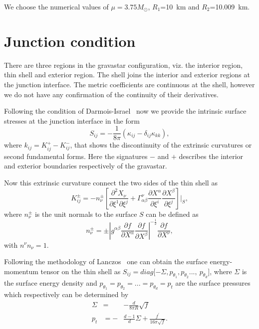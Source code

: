 \documentclass[preprint,12pt]{elsarticle}
\begin{document}
We choose the numerical values of $\mu=3.75M_\odot$, $R_1$=10~km and $R_2$=10.009~km.



\section{Junction condition}
There are three regions in the gravastar configuration, viz.
the interior region, thin shell and exterior region. The shell joins the
interior and exterior regions at the junction interface. The metric
coefficients are continuous at the shell, however we do not have any confirmation
of the continuity of their derivatives.

Following the condition of Darmois-Israel~\cite{Darmois1927,Israel1966} now we
provide the intrinsic surface stresses at the junction interface in the form
\begin{equation}
S_{ij}=-\frac{1}{8\pi}(\kappa_{ij}-\delta_{ij}\kappa_{kk}),\label{eq29}
\end{equation}
where $k_{ij}=K^+_{ij}-K^-_{ij}$, that shows the discontinuity of the
extrinsic curvatures or second fundamental forms. Here the signatures $-$ and $+$
describes the interior and exterior boundaries respectively of the gravastar.

Now this extrinsic curvature connect the two sides of the thin shell as
\begin{equation}
K_{ij}^{\pm}=-n_{\nu}^{\pm}\left[\frac{\partial^{2}X_{\nu}}{\partial
\xi^{1}\partial\xi^{j}}+\Gamma_{\alpha\beta}^{\nu}\frac{\partial
X^{\alpha}}{\partial \xi^{i}}\frac{\partial X^{\beta}}{\partial
\xi^{j}} \right]|_S, \label{eq30}
\end{equation}
where $n_{\nu}^{\pm}$ is the unit normals to the surface $S$ can be defined as
\begin{equation}
n_{\nu}^{\pm}=\pm\left|g^{\alpha\beta}\frac{\partial f}{\partial
X^{\alpha}}\frac{\partial f}{\partial X^{\beta}}
\right|^{-\frac{1}{2}}\frac{\partial f}{\partial X^{\nu}}, \label{eq31}
\end{equation}
with $n^{\nu}n_{\nu}=1$.

Following the methodology of Lanczos~\cite{Lanczos1924} one can obtain the surface energy-momentum
tensor on the thin shell as $S_{ij}=diag[{-\Sigma, p_{\theta_1}, p_{\theta_2}...,~p_{\theta_d}}$],
where $\Sigma$ is the surface energy density and $ p_{\theta_{1}}=p_{\theta_{2}}=...=p_{\theta_{d}}=p_t$
are the surface pressures which respectively can be determined by
\begin{eqnarray}
\Sigma&=&-\frac{d}{8\pi R}\sqrt{f} \label{eq32}\\
p_t&=-&\frac{d-1}{d}\Sigma +\frac{f^{'}}{16\pi\sqrt{f}}. \label{eq33}
\end{eqnarray}
\end{document}
